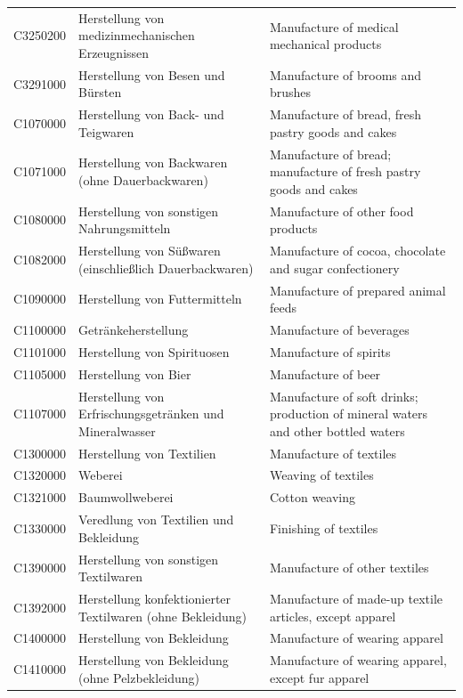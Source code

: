 \begin{longtable}{|p{3cm}|p{6cm}|p{6cm}|}
 C3250200   & Herstellung von medizinmechanischen Erzeugnissen   & Manufacture of medical mechanical products    \\
 C3291000   & Herstellung von Besen und Bürsten   & Manufacture of brooms and brushes    \\
 C1070000   & Herstellung von Back- und Teigwaren   & Manufacture of bread, fresh pastry goods and cakes    \\
 C1071000   & Herstellung von Backwaren (ohne Dauerbackwaren)   & Manufacture of bread; manufacture of fresh pastry goods and cakes    \\
 C1080000   & Herstellung von sonstigen Nahrungsmitteln   & Manufacture of other food products    \\
 C1082000   & Herstellung von Süßwaren (einschließlich Dauerbackwaren)   & Manufacture of cocoa, chocolate and sugar confectionery    \\
 C1090000   & Herstellung von Futtermitteln   & Manufacture of prepared animal feeds    \\
 C1100000   & Getränkeherstellung   & Manufacture of beverages    \\
 C1101000   & Herstellung von Spirituosen   & Manufacture of spirits    \\
 C1105000   & Herstellung von Bier   & Manufacture of beer    \\
 C1107000   & Herstellung von Erfrischungsgetränken und Mineralwasser   & Manufacture of soft drinks; production of mineral waters and other bottled waters    \\
 C1300000   & Herstellung von Textilien   & Manufacture of textiles    \\
 C1320000   & Weberei   & Weaving of textiles    \\
 C1321000   & Baumwollweberei   & Cotton weaving    \\
 C1330000   & Veredlung von Textilien und Bekleidung   & Finishing of textiles    \\
 C1390000   & Herstellung von sonstigen Textilwaren   & Manufacture of other textiles    \\
 C1392000   & Herstellung konfektionierter Textilwaren (ohne Bekleidung)   & Manufacture of made-up textile articles, except apparel    \\
 C1400000   & Herstellung von Bekleidung   & Manufacture of wearing apparel    \\
 C1410000   & Herstellung von Bekleidung (ohne Pelzbekleidung)   & Manufacture of wearing apparel, except fur apparel    \\

\end{longtable}

